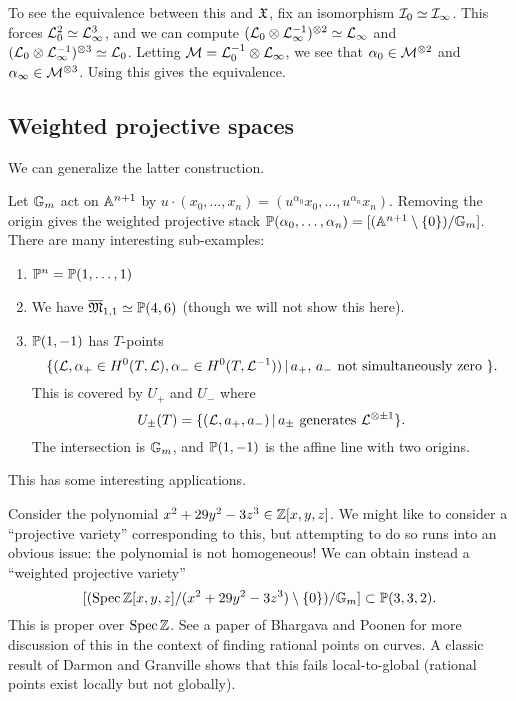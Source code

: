 \documentclass{amsart}
\begin{document}
\begin{ex}
\begin{enumerate}
			To see the equivalence between this and $\Xfr$, fix an isomorphism $\Ic_0 \simeq \Ic_\infty$.
			This forces $\Lc_0^2 \simeq \Lc_\infty^3$, and we can compute $(\Lc_0 \otimes \Lc_\infty\inv)^{\otimes 2} \simeq \Lc_\infty$ and $(\Lc_0 \otimes \Lc_\infty\inv)^{\otimes 3} \simeq \Lc_0$.
			Letting $\Mc = \Lc_0\inv \otimes \Lc_\infty$, we see that $\alpha_0 \in \Mc^{\otimes 2}$ and $\alpha_\infty \in \Mc^{\otimes 3}$.
			Using this gives the equivalence.
	\end{enumerate}
\end{ex}

\subsection{Weighted projective spaces}

We can generalize the latter construction.

\begin{ex}
	Let $\GG_m$ act on $\AA^{n+1}$ by $u \cdot (x_0, \dots, x_n) = (u^{\alpha_0} x_0, \dots, u^{\alpha_n} x_n)$.
	Removing the origin gives the weighted projective stack $\PP(\alpha_0, \dots, \alpha_n) = [(\AA^{n+1} \setminus \{0\}) / \GG_m]$.
	There are many interesting sub-examples:
	\begin{enumerate}
		\item $\PP^n = \PP(1, \dots, 1)$
		\item We have $\ol{\Mfr}_{1,1} \simeq \PP(4, 6)$ (though we will not show this here).
		\item $\PP(1, -1)$ has $T$-points 
			\[
				\{ (\Lc, \alpha_+ \in H^0(T, \Lc), \alpha_- \in H^0(T, \Lc\inv)) \,|\, \textrm{$a_+$, $a_-$ not simultaneously zero } \}.
			\]
			This is covered by $U_+$ and $U_-$ where 
			\[
				U_\pm(T) = \{ (\Lc, a_+, a_-) \,|\, \textrm{$a_\pm$ generates $\Lc^{\otimes \pm 1}$} \}.
			\]
			The intersection is $\GG_m$, and $\PP(1, -1)$ is the affine line with two origins.
	\end{enumerate}
\end{ex}

This has some interesting applications.

\begin{ex}
	Consider the polynomial $x^2 + 29y^2 - 3z^3 \in \ZZ[x, y, z]$.
	We might like to consider a ``projective variety'' corresponding to this, but attempting to do so runs into an obvious issue: the polynomial is not homogeneous!
	We can obtain instead a ``weighted projective variety'' 
	\[
		[(\Spec \ZZ[x, y, z] / (x^2 + 29y^2 - 3z^3) \setminus \{0\}) / \GG_m] \subset \PP(3, 3, 2).
	\]
	This is proper over $\Spec \ZZ$.
	See a paper of Bhargava and Poonen for more discussion of this in the context of finding rational points on curves.
	A classic result of Darmon and Granville shows that this fails local-to-global (rational points exist locally but not globally).
\end{ex}
\end{document}
